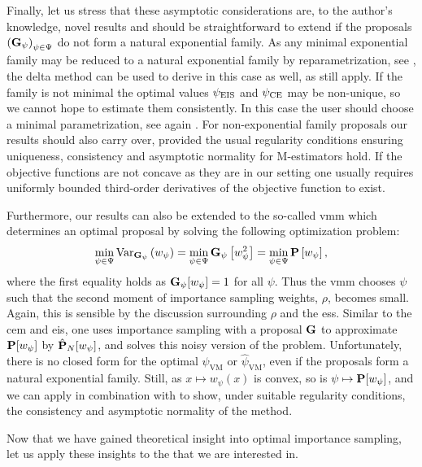 Finally, let us stress that these asymptotic considerations are, to the author's knowledge, novel results and should be straightforward to extend if the proposals $\left(\G_{\psi}\right)_{\psi \in \Psi}$ do not form a natural exponential family. As any minimal exponential family may be reduced to a natural exponential family by reparametrization, see \citep[Theorem 1.9]{Brown1986Fundamentals}, the delta method can be used to derive  in this case as well, as  still apply. If the family is not minimal the optimal values $\peis$ and $\pce$ may be non-unique, so we cannot hope to estimate them consistently. In this case the user should choose a minimal parametrization, see again \citep[Theorem 1.9]{Brown1986Fundamentals}. 
For non-exponential family proposals our results should also carry over, provided the usual regularity conditions ensuring uniqueness, consistency and asymptotic normality for M-estimators hold. If the objective functions are not concave as they are in our setting one usually requires uniformly bounded third-order derivatives of the objective function to exist. 

Furthermore, our results can also be extended to the so-called \gls{vmm} which determines an optimal proposal by solving the following optimization problem:
$$
\min_{\psi\in\Psi} \var_{\G_{\psi}} \left( w_{\psi}  \right) = \min_{\psi \in \Psi} \G_{\psi} \left[w_{\psi}^2\right] = \min_{\psi\in\Psi} \P \left[w_{\psi} \right],
$$
where the first equality holds as $\G_{\psi}[w_{\psi}] = 1$ for all $\psi$. Thus the \acrshort{vmm} chooses $\psi$ such that the second moment of importance sampling weights, $\rho$, becomes small. Again, this is sensible by the discussion surrounding $\rho$ and the \acrshort{ess}. Similar to the \acrshort{cem} and \acrshort{eis}, one uses importance sampling with a proposal $\G$ to approximate $\P [w_{\psi}]$ by $\hat\P_{N} [w_{\psi}]$, and solves this noisy version of the problem.
Unfortunately, there is no closed form for the optimal $\psi_{\text{VM}}$ or $\hat\psi_{\text{VM}}$, even if the proposals form a natural exponential family. Still, as $x \mapsto w_{\psi}(x)$ is convex, so is $\psi \mapsto \P [w_{\psi}]$, and we can apply  in combination with  to show, under suitable regularity conditions, the consistency and asymptotic normality of the method. 

Now that we have gained theoretical insight into optimal importance sampling, let us apply these insights to the  that we are interested in.
